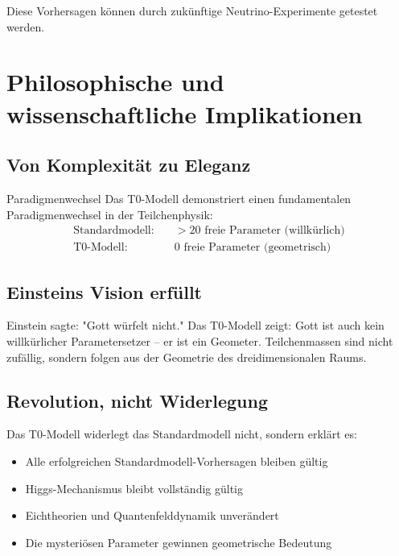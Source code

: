 \documentclass[12pt,a4paper]{article}
\begin{document}
	Diese Vorhersagen können durch zukünftige Neutrino-Experimente getestet werden.
	
	\section{Philosophische und wissenschaftliche Implikationen}
	\label{sec:philosophical_implications}
	
	\subsection{Von Komplexität zu Eleganz}
	\label{subsec:complexity_to_elegance}
	
	\begin{important}{Paradigmenwechsel}{}
		Das T0-Modell demonstriert einen fundamentalen Paradigmenwechsel in der Teilchenphysik:
		\begin{align}
			\text{Standardmodell:} \quad &> 20 \text{ freie Parameter (willkürlich)} \\
			\text{T0-Modell:} \quad &0 \text{ freie Parameter (geometrisch)}
		\end{align}
	\end{important}
	
	\subsection{Einsteins Vision erfüllt}
	\label{subsec:einstein_vision}
	
	Einstein sagte: "Gott würfelt nicht." Das T0-Modell zeigt: Gott ist auch kein willkürlicher Parametersetzer -- er ist ein Geometer. Teilchenmassen sind nicht zufällig, sondern folgen aus der Geometrie des dreidimensionalen Raums.
	
	\subsection{Revolution, nicht Widerlegung}
	\label{subsec:revolution_not_refutation}
	
	Das T0-Modell widerlegt das Standardmodell nicht, sondern erklärt es:
	
	\begin{itemize}
		\item Alle erfolgreichen Standardmodell-Vorhersagen bleiben gültig
		\item Higgs-Mechanismus bleibt vollständig gültig
		\item Eichtheorien und Quantenfelddynamik unverändert
		\item Die mysteriösen Parameter gewinnen geometrische Bedeutung
	\end{itemize}
	
\end{document}
